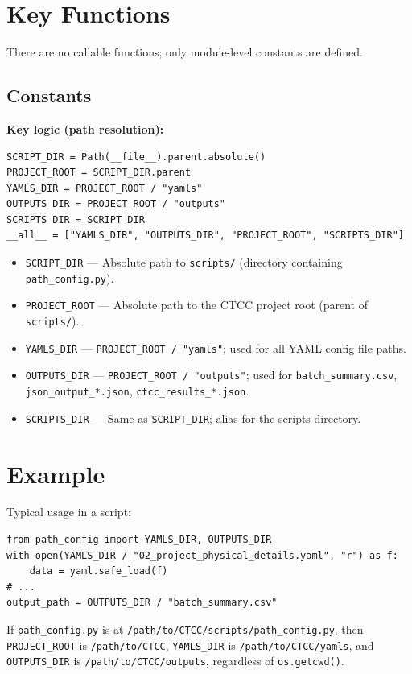 \documentclass[ctcc_full_documentation.tex]{subfiles}
\begin{document}
\section{Key Functions}

There are no callable functions; only module-level constants are defined.

\subsection{Constants}

\textbf{Key logic (path resolution):}
\begin{lstlisting}
SCRIPT_DIR = Path(__file__).parent.absolute()
PROJECT_ROOT = SCRIPT_DIR.parent
YAMLS_DIR = PROJECT_ROOT / "yamls"
OUTPUTS_DIR = PROJECT_ROOT / "outputs"
SCRIPTS_DIR = SCRIPT_DIR
__all__ = ["YAMLS_DIR", "OUTPUTS_DIR", "PROJECT_ROOT", "SCRIPTS_DIR"]
\end{lstlisting}

\begin{itemize}
    \item \texttt{SCRIPT\_DIR} --- Absolute path to \texttt{scripts/} (directory containing \texttt{path\_config.py}).
    \item \texttt{PROJECT\_ROOT} --- Absolute path to the CTCC project root (parent of \texttt{scripts/}).
    \item \texttt{YAMLS\_DIR} --- \texttt{PROJECT\_ROOT / "yamls"}; used for all YAML config file paths.
    \item \texttt{OUTPUTS\_DIR} --- \texttt{PROJECT\_ROOT / "outputs"}; used for \texttt{batch\_summary.csv}, \texttt{json\_output\_*.json}, \texttt{ctcc\_results\_*.json}.
    \item \texttt{SCRIPTS\_DIR} --- Same as \texttt{SCRIPT\_DIR}; alias for the scripts directory.
\end{itemize}

\section{Example}

Typical usage in a script:
\begin{lstlisting}
from path_config import YAMLS_DIR, OUTPUTS_DIR
with open(YAMLS_DIR / "02_project_physical_details.yaml", "r") as f:
    data = yaml.safe_load(f)
# ...
output_path = OUTPUTS_DIR / "batch_summary.csv"
\end{lstlisting}

If \texttt{path\_config.py} is at \texttt{/path/to/CTCC/scripts/path\_config.py}, then \texttt{PROJECT\_ROOT} is \texttt{/path/to/CTCC}, \texttt{YAMLS\_DIR} is \texttt{/path/to/CTCC/yamls}, and \texttt{OUTPUTS\_DIR} is \texttt{/path/to/CTCC/outputs}, regardless of \texttt{os.getcwd()}.
\end{document}
